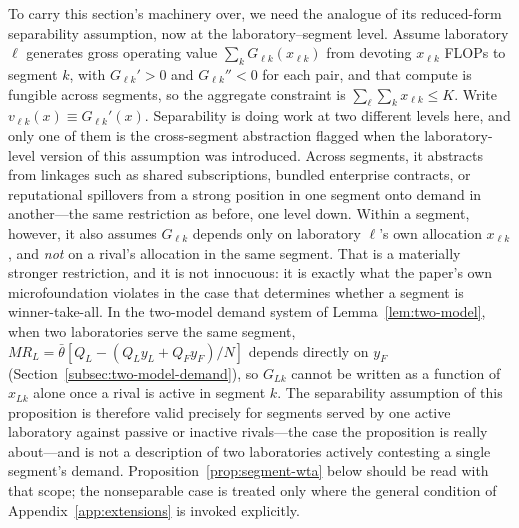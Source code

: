 \documentclass[11pt]{article}
\begin{document}
To carry this section's machinery over, we need the analogue of its reduced-form separability assumption, now at the laboratory--segment level. Assume laboratory $\ell$ generates gross operating value $\sum_k G_{\ell k}(x_{\ell k})$ from devoting $x_{\ell k}$ FLOPs to segment $k$, with $G_{\ell k}'>0$ and $G_{\ell k}''<0$ for each pair, and that compute is fungible across segments, so the aggregate constraint is $\sum_\ell\sum_k x_{\ell k}\leq K$. Write $v_{\ell k}(x)\equiv G_{\ell k}'(x)$. Separability is doing work at two different levels here, and only one of them is the cross-segment abstraction flagged when the laboratory-level version of this assumption was introduced. Across segments, it abstracts from linkages such as shared subscriptions, bundled enterprise contracts, or reputational spillovers from a strong position in one segment onto demand in another---the same restriction as before, one level down. Within a segment, however, it also assumes $G_{\ell k}$ depends only on laboratory $\ell$'s own allocation $x_{\ell k}$, and \emph{not} on a rival's allocation in the same segment. That is a materially stronger restriction, and it is not innocuous: it is exactly what the paper's own microfoundation violates in the case that determines whether a segment is winner-take-all. In the two-model demand system of Lemma~\ref{lem:two-model}, when two laboratories serve the same segment, $MR_L=\bar\theta[Q_L-(Q_Ly_L+Q_Fy_F)/N]$ depends directly on $y_F$ (Section~\ref{subsec:two-model-demand}), so $G_{Lk}$ cannot be written as a function of $x_{Lk}$ alone once a rival is active in segment $k$. The separability assumption of this proposition is therefore valid precisely for segments served by one active laboratory against passive or inactive rivals---the case the proposition is really about---and is not a description of two laboratories actively contesting a single segment's demand. Proposition~\ref{prop:segment-wta} below should be read with that scope; the nonseparable case is treated only where the general condition of Appendix~\ref{app:extensions} is invoked explicitly.
\end{document}
